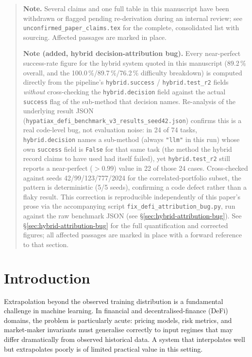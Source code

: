 \documentclass[twoside,11pt]{article}
\begin{document}
\begin{quote}\small
\textbf{Note.} Several claims and one full table in this manuscript have
been withdrawn or flagged pending re-derivation during an internal review;
see \texttt{unconfirmed\_paper\_claims.tex} for the complete, consolidated
list with sourcing. Affected passages are marked in place.

\medskip
\noindent\textbf{Note (added, hybrid decision-attribution bug).} Every
near-perfect success-rate figure for the hybrid system quoted in this
manuscript (89.2\,\% overall, and the 100.0\,\%/89.7\,\%/76.2\,\% difficulty
breakdown) is computed directly from the pipeline's \texttt{hybrid.success}
/ \texttt{hybrid.test\_r2} fields \emph{without} cross-checking the
\texttt{hybrid.decision} field against the actual \texttt{success} flag of
the sub-method that decision names. Re-analysis of the underlying result
JSON (\texttt{hypatiax\_defi\_benchmark\_v3\_results\_seed42.json}) confirms
this is a real code-level bug, not evaluation noise: in 24 of 74 tasks,
\texttt{hybrid.decision} names a sub-method (always \texttt{"llm"} in this
run) whose own \texttt{success} field is \texttt{False} for that same task
(the method the hybrid record claims to have used had itself failed), yet
\texttt{hybrid.test\_r2} still reports a near-perfect ($>0.99$) value in 22
of those 24 cases. Cross-checked against seeds
42/99/123/777/2024 for the correlated-portfolio subset, the pattern is
deterministic (5/5 seeds), confirming a code defect rather than a flaky
result. This correction is reproducible independently of this paper's prose
via the accompanying script \texttt{fix\_defi\_attribution\_bug.py}, run
against the raw benchmark JSON (see \S\ref{sec:hybrid-attribution-bug}).
See \S\ref{sec:hybrid-attribution-bug} for the full quantification
and corrected figures; all affected passages are marked in place with a
forward reference to that section.
\end{quote}


\tableofcontents
\newpage

\section{Introduction}
\label{sec:intro}

Extrapolation beyond the observed training distribution is a fundamental challenge
in machine learning.  In financial and decentralised-finance (DeFi) domains, the
problem is particularly acute: pricing models, risk metrics, and market-maker
invariants must generalise correctly to input regimes that may differ dramatically
from observed historical data.  A system that interpolates well but extrapolates
poorly is of limited practical value in this setting.
\end{document}
